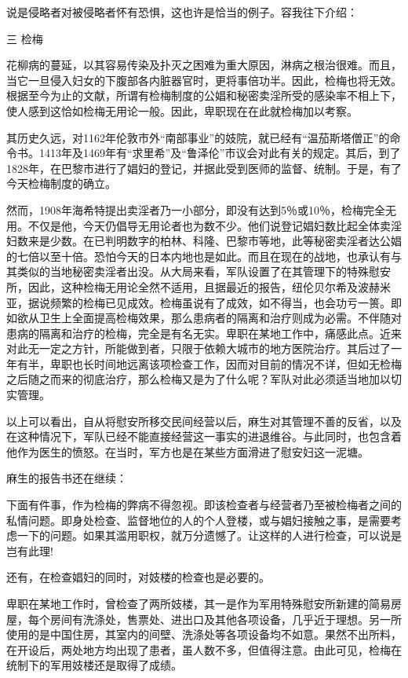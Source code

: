\documentclass[12pt,UTF8]{ctexbook}
\begin{document}
说是侵略者对被侵略者怀有恐惧，这也许是恰当的例子。容我往下介绍：

三 检梅

花柳病的蔓延，以其容易传染及扑灭之困难为重大原因，淋病之根治很难。而且，当它一旦侵入妇女的下腹部各内脏器官时，更将事倍功半。因此，检梅也将无效。根据至今为止的文献，所谓有检梅制度的公娼和秘密卖淫所受的感染率不相上下，使人感到这恰如检梅无用论一般。因此，卑职现在在此就检梅加以考察。

其历史久远，对1162年伦敦市外“南部事业”的妓院，就已经有“温茄斯塔僧正”的命令书。1413年及1469年有“求里希”及“鲁泽伦”市议会对此有关的规定。其后，到了1828年，在巴黎市进行了娼妇的登记，并据此受到医师的监督、统制。于是，有了今天检梅制度的确立。

然而，1908年海希特提出卖淫者乃一小部分，即没有达到5％或10％，检梅完全无用。不仅是他，今天仍倡导无用论者也为数不少。他们说登记娼妇数比起全体卖淫妇数来是少数。在已判明数字的柏林、科隆、巴黎市等地，此等秘密卖淫者达公娼的七倍以至十倍。恐怕今天的日本内地也是如此。而且在现在的战地，也承认有与其类似的当地秘密卖淫者出没。从大局来看，军队设置了在其管理下的特殊慰安所，因此，这种检梅无用论全然不适用，且据最近的报告，纽伦贝尔希及波赫米亚，据说频繁的检梅已见成效。检梅虽说有了成效，如不得当，也会功亏一篑。即如欲从卫生上全面提高检梅效果，那么患病者的隔离和治疗则成为必需。不伴随对患病的隔离和治疗的检梅，完全是有名无实。卑职在某地工作中，痛感此点。近来对此无一定之方针，所能做到者，只限于依赖大城市的地方医院治疗。其后过了一年有半，卑职也长时间地远离该项检查工作，因而对目前的情况不详，但如无检梅之后随之而来的彻底治疗，那么检梅又是为了什么呢？军队对此必须适当地加以切实管理。

以上可以看出，自从将慰安所移交民间经营以后，麻生对其管理不善的反省，以及在这种情况下，军队已经不能直接经营这一事实的进退维谷。与此同时，也包含着他作为医生的愤怒。在当时，军方也是在某些方面滑进了慰安妇这一泥塘。

麻生的报告书还在继续：

下面有件事，作为检梅的弊病不得忽视。即该检查者与经营者乃至被检梅者之间的私情问题。即身处检查、监督地位的人的个人登楼，或与娼妇接触之事，是需要考虑一下的问题。如果其滥用职权，就万分遗憾了。让这样的人进行检查，可以说是岂有此理!

还有，在检查娼妇的同时，对妓楼的检查也是必要的。

卑职在某地工作时，曾检查了两所妓楼，其一是作为军用特殊慰安所新建的简易房屋，每个房间有洗涤处，售票处、进出口及其他各项设备，几乎近于理想。另一所使用的是中国住房，其室内的间壁、洗涤处等各项设备均不如意。果然不出所料，在开设后，两处地方均出现了患者，虽人数不多，但值得注意。由此可见，检梅在统制下的军用妓楼还是取得了成绩。
\end{document}
